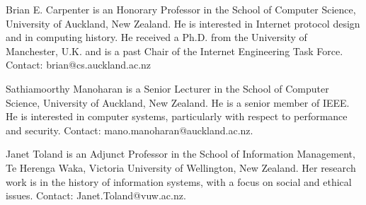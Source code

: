 \documentclass{IEEEcsmag}
\begin{document}



\begin{IEEEbiography}{Brian E. Carpenter} is an Honorary Professor in the School of Computer Science, University of Auckland, New Zealand. He is interested in Internet protocol design and in computing history. He received a Ph.D. from the University of Manchester, U.K. and is a past Chair of the Internet Engineering Task Force. Contact: brian@cs.auckland.ac.nz\vspace*{8pt}
\end{IEEEbiography}

\begin{IEEEbiography}{Sathiamoorthy Manoharan} is a Senior Lecturer in the School of Computer Science, University of Auckland, New Zealand.
He is a senior member of IEEE. He is interested in computer systems, particularly with respect to performance and security. Contact: mano.manoharan@auckland.ac.nz.\vspace*{8pt}
\end{IEEEbiography}

\begin{IEEEbiography}{Janet Toland} is an Adjunct Professor in the School of Information Management,
Te Herenga Waka, Victoria University of Wellington, New Zealand. Her research work is in the history of
information systems, with a focus on social and ethical issues. Contact: Janet.Toland@vuw.ac.nz.\vspace*{8pt}
\end{IEEEbiography}
\end{document}
